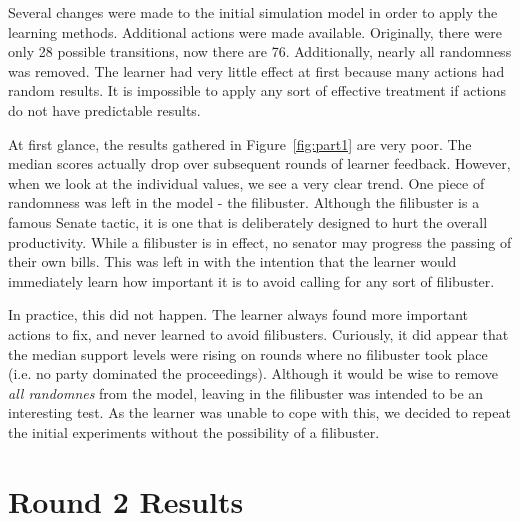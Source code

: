 \documentclass{sig-alternate}
\newcounter{over}
\newcommand{\fig}[1]{Figure~\ref{fig:#1}}
\begin{document}
Several changes were made to the initial simulation model in order to apply the learning methods. 
Additional actions were made available. Originally, there were only 28 possible transitions, now there
are 76. Additionally, nearly all randomness was removed. The learner had very little effect at first because
many actions had random results. It is impossible to apply any sort of effective treatment if actions do not
have predictable results. 

At first glance, the results gathered in \fig{part1} are very poor. The median scores actually drop over
subsequent rounds of learner feedback. 
However, when we look at the individual values, we see a very clear trend. One piece of randomness was left in the model -
the filibuster. Although the filibuster is a famous Senate tactic, it is one that is deliberately designed to hurt the overall
productivity. While a filibuster is in effect, no senator may progress the passing of their own bills. This was left in with 
the intention that the learner would immediately learn how important it is to avoid calling for any sort of filibuster.

In practice, this did not happen. The learner always found more important actions to fix, and never learned to avoid filibusters. 
Curiously, it did appear that the median support levels were rising on rounds where no filibuster took place (i.e. no party
dominated the proceedings). Although it would be wise to remove {\em all randomnes} from the model, leaving in the 
filibuster was intended to be an interesting test. 
As the learner was unable to cope with this, we decided to repeat the initial experiments without the possibility of a filibuster. 

\section{Round 2 Results}
\end{document}

